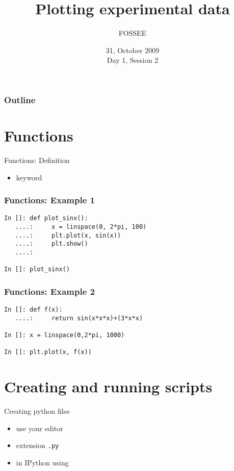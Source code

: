 \documentclass[14pt,compress]{beamer}
\title[Plotting using Python]{Plotting experimental data\\}
\author[FOSSEE] {FOSSEE}
\institute[IIT Bombay] {Department of Aerospace Engineering\\IIT Bombay}
\date[] {31, October 2009\\Day 1, Session 2}
\newcounter{time}
\newcommand{\inctime}[1]{\addtocounter{time}{#1}{\tiny \thetime\ m}}
\newcommand{\typ}[1]{\lstinline{#1}}
\newcommand{\kwrd}[1]{ \texttt{\textbf{\color{blue}{#1}}}  }
\begin{document}
\begin{frame}
  \titlepage
\end{frame}

\begin{frame}
  \frametitle{Outline}
  \tableofcontents
\end{frame}

\section{Functions}
\begin{frame}{Functions: Definition}
\begin{itemize}
  \item \kwrd{def} keyword
\end{itemize}
\end{frame}

\begin{frame}[fragile]
\frametitle{Functions: Example 1}
  \begin{lstlisting}
In []: def plot_sinx():
   ....:     x = linspace(0, 2*pi, 100)
   ....:     plt.plot(x, sin(x))
   ....:     plt.show()
   ....:    

In []: plot_sinx()
  \end{lstlisting}
\end{frame}

\begin{frame}[fragile]
\frametitle{Functions: Example 2}
  \begin{lstlisting}
In []: def f(x):
   ....:     return sin(x*x*x)+(3*x*x)

In []: x = linspace(0,2*pi, 1000)

In []: plt.plot(x, f(x))
  \end{lstlisting}
  \inctime{10}
\end{frame}

\section{Creating and running scripts}
\begin{frame}
  {Creating python files}
  \begin{itemize}
    \item use your editor
    \item extension \typ{.py}
    \item in IPython using \kwrd{\%run}
  \end{itemize}
\inctime{5}
\end{frame}
\end{document}
